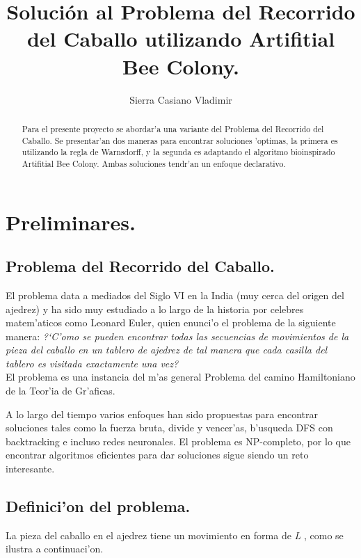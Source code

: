 \documentclass[12pt]{article}
\title{Solución al Problema del Recorrido del Caballo
    utilizando Artifitial Bee Colony.}
\author{Sierra Casiano Vladimir}
\begin{document}
    \maketitle

    \begin{abstract}
        Para el presente proyecto se abordar'a una variante del Problema del Recorrido del
        Caballo.
        Se presentar'an dos maneras para encontrar soluciones
        'optimas, la primera es utilizando la regla de Warnsdorff, y la segunda
        es adaptando el algoritmo bioinspirado Artifitial Bee Colony. Ambas
        soluciones tendr'an un enfoque declarativo.
    \end{abstract}


    \section{Preliminares.}

    \subsection{Problema del Recorrido del Caballo.}


    El problema data a mediados del Siglo VI en la India \cite{watkins} (muy cerca del
    origen del ajedrez) y ha sido muy estudiado a lo largo de la historia por
    celebres matem'aticos como
    Leonard Euler, quien enunci'o el problema de la siguiente manera:
    \textit{ ?`C'omo se pueden encontrar todas las secuencias de movimientos de
    la pieza del caballo en un tablero de ajedrez de tal manera que cada casilla del
    tablero es visitada exactamente una vez?
    }  \cite{golumbic2021} \\
    El problema es una instancia del m'as general
    Problema del camino Hamiltoniano de la  Teor'ia de Gr'aficas.

    A lo largo del tiempo varios enfoques han sido propuestas para
    encontrar soluciones tales como la fuerza bruta, divide y vencer'as,
    b'usqueda DFS con backtracking e incluso redes neuronales.
    El problema es NP-completo, por lo que encontrar algoritmos eficientes
    para dar soluciones sigue siendo un reto interesante.



    \subsection{Definici'on del problema.}
    La pieza del caballo en el ajedrez tiene un movimiento en forma de \textit{L} , como
    se ilustra a continuaci'on.
\end{document}
